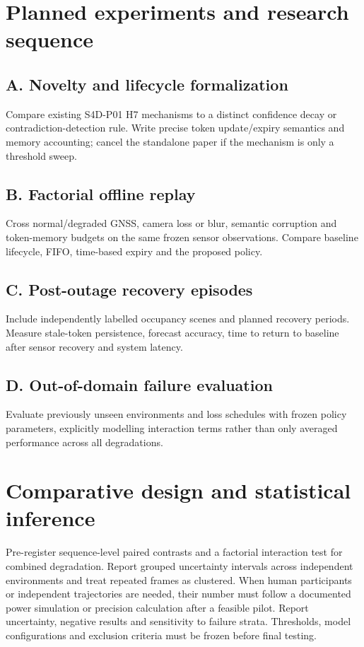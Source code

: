 \documentclass[11pt,a4paper]{article}
\begin{document}
\section{Planned experiments and research sequence}
\subsection{A. Novelty and lifecycle formalization}
Compare existing S4D-P01 H7 mechanisms to a distinct confidence decay or contradiction-detection rule. Write precise token update/expiry semantics and memory accounting; cancel the standalone paper if the mechanism is only a threshold sweep.

\subsection{B. Factorial offline replay}
Cross normal/degraded GNSS, camera loss or blur, semantic corruption and token-memory budgets on the same frozen sensor observations. Compare baseline lifecycle, FIFO, time-based expiry and the proposed policy.

\subsection{C. Post-outage recovery episodes}
Include independently labelled occupancy scenes and planned recovery periods. Measure stale-token persistence, forecast accuracy, time to return to baseline after sensor recovery and system latency.

\subsection{D. Out-of-domain failure evaluation}
Evaluate previously unseen environments and loss schedules with frozen policy parameters, explicitly modelling interaction terms rather than only averaged performance across all degradations.

\section{Comparative design and statistical inference}
Pre-register sequence-level paired contrasts and a factorial interaction test for combined degradation. Report grouped uncertainty intervals across independent environments and treat repeated frames as clustered. When human participants or independent trajectories are needed, their number must follow a documented power simulation or precision calculation after a feasible pilot. Report uncertainty, negative results and sensitivity to failure strata. Thresholds, model configurations and exclusion criteria must be frozen before final testing.
\end{document}
